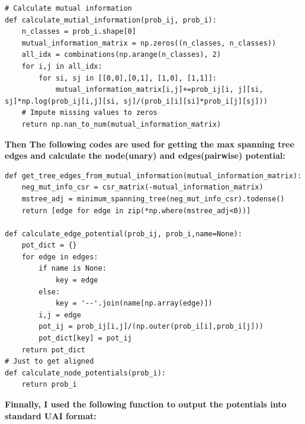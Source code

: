 \documentclass{article}
\begin{document}
\begin{enumerate}
\begin{verbatim}
# Calculate mutual information
def calculate_mutial_information(prob_ij, prob_i):
    n_classes = prob_i.shape[0]
    mutual_information_matrix = np.zeros((n_classes, n_classes))
    all_idx = combinations(np.arange(n_classes), 2)
    for i,j in all_idx:
        for si, sj in [[0,0],[0,1], [1,0], [1,1]]:
            mutual_information_matrix[i,j]+=prob_ij[i, j][si, sj]*np.log(prob_ij[i,j][si, sj]/(prob_i[i][si]*prob_i[j][sj]))
    # Impute missing values to zeros
    return np.nan_to_num(mutual_information_matrix)
\end{verbatim}

\textbf{Then The following codes are used for getting the max spanning tree edges and calculate the node(unary) and edges(pairwise) potential:}
\begin{verbatim}
def get_tree_edges_from_mutual_information(mutual_information_matrix):
    neg_mut_info_csr = csr_matrix(-mutual_information_matrix)
    mstree_adj = minimum_spanning_tree(neg_mut_info_csr).todense()
    return [edge for edge in zip(*np.where(mstree_adj<0))]

def calculate_edge_potential(prob_ij, prob_i,name=None):
    pot_dict = {}
    for edge in edges:
        if name is None:
            key = edge
        else:
            key = '--'.join(name[np.array(edge)])
        i,j = edge
        pot_ij = prob_ij[i,j]/(np.outer(prob_i[i],prob_i[j]))
        pot_dict[key] = pot_ij
    return pot_dict
# Just to get aligned
def calculate_node_potentials(prob_i):
    return prob_i
\end{verbatim}

\textbf{Finnally, I used the following function to output the potentials into standard UAI format:}


\end{enumerate}
\end{document}
